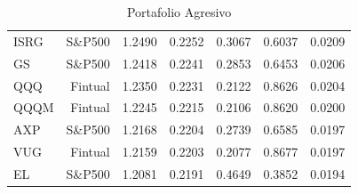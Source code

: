\begin{table}[htbp]
\begin{tabular}{lrrrrrr}
ISRG & S\&P500 & 1.2490 & 0.2252 & 0.3067 & 0.6037 & 0.0209 \\
GS & S\&P500 & 1.2418 & 0.2241 & 0.2853 & 0.6453 & 0.0206 \\
QQQ & Fintual & 1.2350 & 0.2231 & 0.2122 & 0.8626 & 0.0204 \\
QQQM & Fintual & 1.2245 & 0.2215 & 0.2106 & 0.8620 & 0.0200 \\
AXP & S\&P500 & 1.2168 & 0.2204 & 0.2739 & 0.6585 & 0.0197 \\
VUG & Fintual & 1.2159 & 0.2203 & 0.2077 & 0.8677 & 0.0197 \\
EL & S\&P500 & 1.2081 & 0.2191 & 0.4649 & 0.3852 & 0.0194 \\
\hline
\end{tabular}
\caption{Portafolio Agresivo}
\label{tab:portafolio-aggressive}
\end{table}